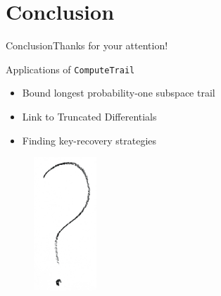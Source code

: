 \documentclass[%
    10pt,
    professionalfont,
    aspectratio=169,
]{beamer}
\begin{document}
\section{Conclusion}
\begin{frame}{Conclusion}{Thanks for your attention!}
    \centering
    \begin{minipage}{0.5\textwidth}
    \begin{block}{Applications of \texttt{ComputeTrail}}
        \begin{itemize}
            \item Bound longest probability-one subspace trail
            \item Link to Truncated Differentials
            \item Finding key-recovery strategies
        \end{itemize}
    \end{block}
    \end{minipage}
    \begin{minipage}{0.45\textwidth}
        \centering
        \begin{figure}[!htb]
            \includegraphics[height=50mm]{data/flickr/questionmark.png}
        \end{figure}
    \end{minipage}
\end{frame}

\end{document}
